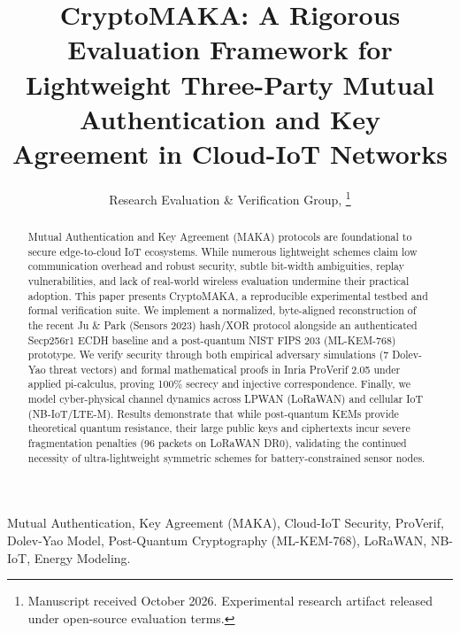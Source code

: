 \documentclass[journal,10pt,twocolumn]{IEEEtran}
\begin{document}
\title{CryptoMAKA: A Rigorous Evaluation Framework for Lightweight Three-Party Mutual Authentication and Key Agreement in Cloud-IoT Networks}

\author{Research Evaluation \& Verification Group, 
\thanks{Manuscript received October 2026. Experimental research artifact released under open-source evaluation terms.}}


\maketitle

\begin{abstract}
Mutual Authentication and Key Agreement (MAKA) protocols are foundational to secure edge-to-cloud IoT ecosystems. While numerous lightweight schemes claim low communication overhead and robust security, subtle bit-width ambiguities, replay vulnerabilities, and lack of real-world wireless evaluation undermine their practical adoption. This paper presents CryptoMAKA, a reproducible experimental testbed and formal verification suite. We implement a normalized, byte-aligned reconstruction of the recent Ju \& Park (Sensors 2023) hash/XOR protocol alongside an authenticated Secp256r1 ECDH baseline and a post-quantum NIST FIPS 203 (ML-KEM-768) prototype. We verify security through both empirical adversary simulations (7 Dolev-Yao threat vectors) and formal mathematical proofs in Inria ProVerif 2.05 under applied pi-calculus, proving 100\% secrecy and injective correspondence. Finally, we model cyber-physical channel dynamics across LPWAN (LoRaWAN) and cellular IoT (NB-IoT/LTE-M). Results demonstrate that while post-quantum KEMs provide theoretical quantum resistance, their large public keys and ciphertexts incur severe fragmentation penalties (96 packets on LoRaWAN DR0), validating the continued necessity of ultra-lightweight symmetric schemes for battery-constrained sensor nodes.
\end{abstract}

\begin{IEEEkeywords}
Mutual Authentication, Key Agreement (MAKA), Cloud-IoT Security, ProVerif, Dolev-Yao Model, Post-Quantum Cryptography (ML-KEM-768), LoRaWAN, NB-IoT, Energy Modeling.
\end{IEEEkeywords}
\end{document}
